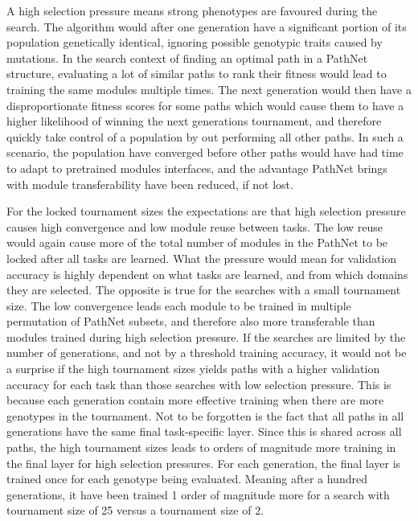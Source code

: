 A high selection pressure means strong phenotypes are favoured during the search. The algorithm would after one generation have a significant portion of its population genetically identical, ignoring possible genotypic traits caused by mutations. In the search context of finding an optimal path in a PathNet structure, evaluating a lot of similar paths to rank their fitness would lead to training the same modules multiple times. The next generation would then have a disproportionate fitness scores for some paths which would cause them to have a higher likelihood of winning the next generations tournament, and therefore quickly take control of a population by out performing all other paths. In such a scenario, the population have converged before other paths would have had time to adapt to pretrained modules interfaces, and the advantage PathNet brings with module transferability have been reduced, if not lost.  

For the locked tournament sizes the expectations are that high selection pressure causes high convergence and low module reuse between tasks. The low reuse would again cause more of the total number of modules in the PathNet to be locked after all tasks are learned. What the pressure would mean for validation accuracy is highly dependent on what tasks are learned, and from which domains they are selected. 
The opposite is true for the searches with a small tournament size. The low convergence leads each module to be trained in multiple permutation of PathNet subsets, and therefore also more transferable than modules trained during high selection pressure. If the searches are limited by the number of generations, and not by a threshold training accuracy, it would not be a surprise if the high tournament sizes yields paths with a higher validation accuracy for each task than those searches with low selection pressure. This is because each generation contain more effective training when there are more genotypes in the tournament. Not to be forgotten is the fact that all paths in all generations have the same final task-specific layer.  Since this is shared across all paths, the high tournament sizes leads to orders of magnitude more training in the final layer for high selection pressures. For each generation, the final layer is trained once for each genotype being evaluated. Meaning after a hundred generations, it have been trained 1 order of magnitude more for a search with tournament size of 25 versus a tournament size of 2. 

